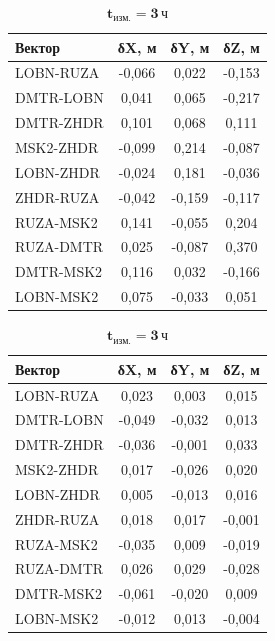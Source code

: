 \begin{table} [htbp]
{\begin{subtable}{.47\linewidth}
\begin{tabular}{ l
			S[table-number-alignment = center]
			S[table-number-alignment = center]
			S[table-number-alignment = center] }
		
		\hline
		\textbf{Вектор}				& \textbf{δX, м}	& \textbf{δY, м}	& \textbf{δZ, м}	\\ \hline
		LOBN-RUZA					&     -0,066		& 	   0,022		&     -0,153		\\ %
		DMTR-LOBN					&      0,041		&      0,065		&     -0,217		\\ %
		DMTR-ZHDR					&      0,101		&      0,068		&      0,111		\\ %
		MSK2-ZHDR					&     -0,099		&      0,214		&     -0,087		\\ %
		LOBN-ZHDR					&     -0,024		&      0,181		&     -0,036		\\ %
		ZHDR-RUZA					&     -0,042		&     -0,159		&     -0,117		\\ %
		RUZA-MSK2					&      0,141		&     -0,055		&      0,204		\\ %
		RUZA-DMTR					&      0,025		&     -0,087		&      0,370		\\ %
		DMTR-MSK2					&      0,116		&      0,032		&     -0,166		\\ %
		LOBN-MSK2					&      0,075		&     -0,033		&      0,051		\\ \hline
		
		
	\end{tabular}
\end{subtable}%
 
\vspace{12pt}
 
		\begin{subtable}{.47\linewidth}	
	\centering
	\caption*{$\mathbf{t_\text{изм.}=3\,\text{ч}}$}
	\begin{tabular}{ l
			S[table-number-alignment = center]
			S[table-number-alignment = center]
			S[table-number-alignment = center] }
		
		
		\hline
		\textbf{Вектор}				& \textbf{δX, м}	& \textbf{δY, м}	& \textbf{δZ, м}	\\ \hline
		LOBN-RUZA					&      0,023		& 	   0,003		&      0,015		\\ %
		DMTR-LOBN					&     -0,049		&     -0,032		&      0,013		\\ %
		DMTR-ZHDR					&     -0,036		&     -0,001		&      0,033		\\ %
		MSK2-ZHDR					&      0,017		&     -0,026		&      0,020		\\ %
		LOBN-ZHDR					&      0,005		&     -0,013		&      0,016		\\ %
		ZHDR-RUZA					&      0,018		&      0,017		&     -0,001		\\ %
		RUZA-MSK2					&     -0,035		&      0,009		&     -0,019		\\ %
		RUZA-DMTR					&      0,026		&      0,029		&     -0,028		\\ %
		DMTR-MSK2					&     -0,061		&     -0,020		&      0,009		\\ %
		LOBN-MSK2					&     -0,012		&      0,013		&     -0,004		\\ \hline
		

\end{tabular}
\end{subtable}}
\end{table}
